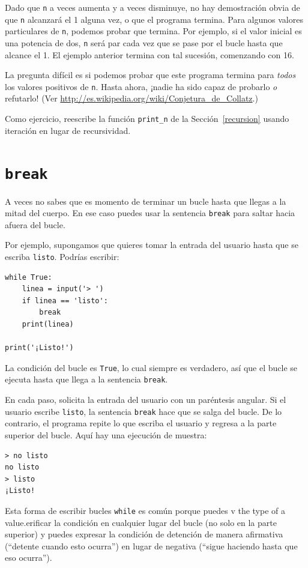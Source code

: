 \documentclass[10pt]{book}
\begin{document}
Dado que {\tt n} a veces aumenta y a veces disminuye, no hay
demostración obvia de que {\tt n} alcanzará el 1 alguna vez, o que el programa
termina.  Para algunos valores particulares de {\tt n}, podemos probar que
termina.  Por ejemplo, si el valor inicial es una potencia de dos,
{\tt n} será par cada vez que se pase por el bucle
hasta que alcance el 1. El ejemplo anterior termina con tal sucesión,
comenzando con 16.

La pregunta difícil es si podemos probar que este programa termina
para {\em todos} los valores positivos de {\tt n}.  Hasta ahora, ¡nadie ha
sido capaz de probarlo {\em o} refutarlo!  (Ver
  \url{http://es.wikipedia.org/wiki/Conjetura_de_Collatz}.)

Como ejercicio, reescribe la función \verb"print_n" de la
Sección~\ref{recursion} usando iteración en lugar de recursividad.


\section{{\tt break}}

A veces no sabes que es momento de terminar un bucle hasta que llegas a la mitad
del cuerpo.  En ese caso puedes usar la sentencia {\tt break}
para saltar hacia afuera del bucle.

Por ejemplo, supongamos que quieres tomar la entrada del usuario hasta que
se escriba {\tt listo}.    Podrías escribir:

\begin{verbatim}
while True:
    linea = input('> ')
    if linea == 'listo':
        break
    print(linea)

print('¡Listo!')
\end{verbatim}
%
La condición del bucle es {\tt True}, lo cual siempre es verdadero, así que el
bucle se ejecuta hasta que llega a la sentencia {\tt break}.

En cada paso, solicita la entrada del usuario con un paréntesis angular.
Si el usuario escribe {\tt listo}, la sentencia {\tt break} hace que se salga
del bucle.  De lo contrario, el programa repite lo que escriba el usuario
y regresa a la parte superior del bucle.  Aquí hay una ejecución de muestra:

\begin{verbatim}
> no listo
no listo
> listo
¡Listo!
\end{verbatim}
%
Esta forma de escribir bucles {\tt while} es común porque puedes
v the type of a value.erificar la condición en cualquier lugar del bucle (no solo en la
parte superior) y puedes expresar la condición de detención de manera afirmativa
(``detente cuando esto ocurra'') en lugar de negativa (``sigue haciendo
hasta que eso ocurra'').
\end{document}
